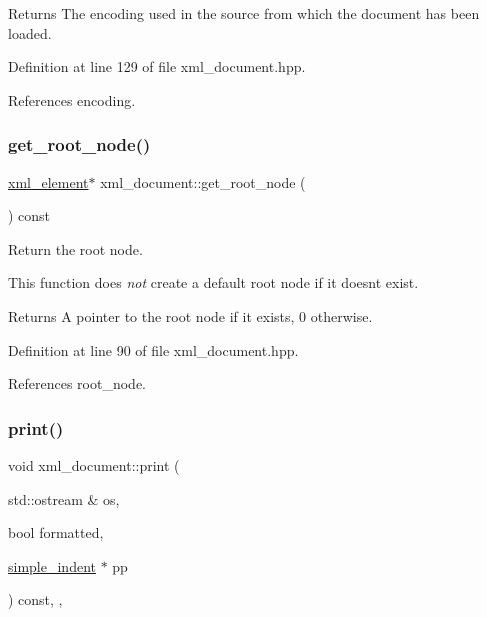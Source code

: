 \begin{DoxyReturn}{Returns}
The encoding used in the source from which the document has been loaded. 
\end{DoxyReturn}


Definition at line 129 of file xml\+\_\+document.\+hpp.



References encoding.

\mbox{\label{classxml__document_a443e21b9032761fc7392cf914aa7f5a6}} 
\subsubsection{\texorpdfstring{get\+\_\+root\+\_\+node()}{get\_root\_node()}}
{\footnotesize\ttfamily \hyperlink{classxml__element}{xml\+\_\+element}$\ast$ xml\+\_\+document\+::get\+\_\+root\+\_\+node (\begin{DoxyParamCaption}{ }\end{DoxyParamCaption}) const\hspace{0.3cm}{\ttfamily [inline]}}



Return the root node. 

This function does {\itshape not} create a default root node if it doesn\textquotesingle{}t exist. \begin{DoxyReturn}{Returns}
A pointer to the root node if it exists, 0 otherwise. 
\end{DoxyReturn}


Definition at line 90 of file xml\+\_\+document.\+hpp.



References root\+\_\+node.

\mbox{\label{classxml__document_ac55f82f4aac49a623187eb872a164af9}} 
\subsubsection{\texorpdfstring{print()}{print()}}
{\footnotesize\ttfamily void xml\+\_\+document\+::print (\begin{DoxyParamCaption}\item[{std\+::ostream \&}]{os,  }\item[{bool}]{formatted,  }\item[{\hyperlink{classsimple__indent}{simple\+\_\+indent} $\ast$}]{pp }\end{DoxyParamCaption}) const\hspace{0.3cm}{\ttfamily [inline]}, {\ttfamily [override]}, {\ttfamily [virtual]}}



